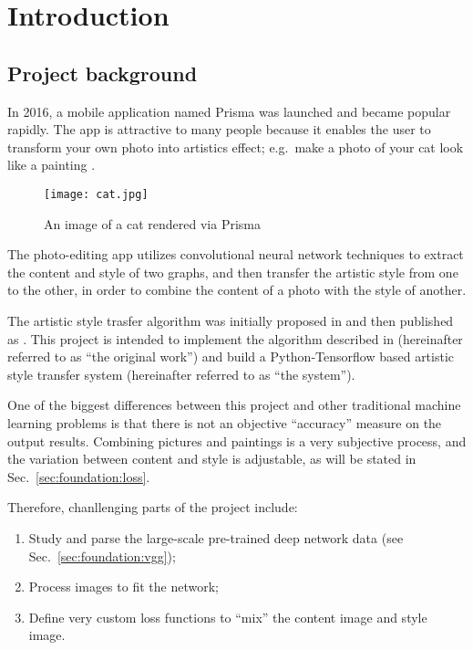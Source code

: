 
\chapter{Introduction}
\label{chap:intro}


\section{Project background}
\label{sec:intro:background}

In 2016, a mobile application named Prisma was launched \cite{wiki:prisma} and became popular rapidly.
The app is attractive to many people because it enables the user to transform your own photo
into artistics effect; e.g.\ make a photo of your cat look like a painting \cite{wiki:prisma}.

    \begin{figure}[!hbt]
    \center
    \texttt{[image: cat.jpg]}
    \caption{An image of a cat rendered via Prisma}
    \label{fig:prisma}
    \end{figure}

The photo-editing app utilizes convolutional neural network techniques to
extract the content and style of two graphs,
and then transfer the artistic style from one to the other,
in order to combine the content of a photo with the style of another.

The artistic style trasfer algorithm was initially proposed in \cite{Gatys:2015ub}
and then published as \cite{Gatys:2016gj}.
This project is intended to implement the algorithm described in \cite{Gatys:2016gj}
(hereinafter referred to as ``the original work'')
and build a Python-Tensorflow based artistic style transfer system
(hereinafter referred to as ``the system'').

One of the biggest differences between this project and other traditional machine learning problems
is that there is not an objective ``accuracy'' measure on the output results.
Combining pictures and paintings is a very subjective process,
and the variation between content and style is adjustable,
as will be stated in Sec.\ \ref{sec:foundation:loss}.

Therefore, chanllenging parts of the project include:
    \begin{enumerate}
        \item Study and parse the large-scale pre-trained deep network data (see Sec.\ \ref{sec:foundation:vgg});
        \item Process images to fit the network;
        \item Define very custom loss functions to ``mix'' the content image and style image.
    \end{enumerate}



